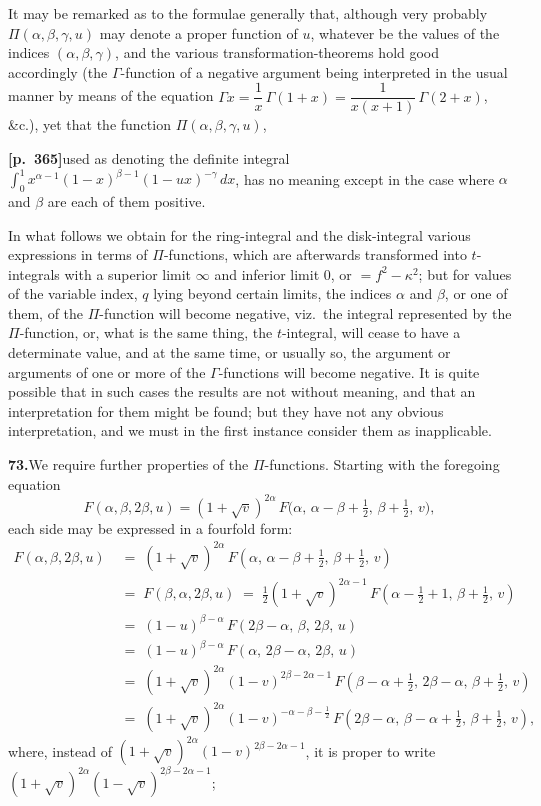 \documentclass[11pt]{article}
\begin{document}
It may be remarked as to the formulae generally that, although very probably $\Pi(\alpha,\beta,\gamma,u)$ may denote a proper function of $u$, whatever be the values of the indices $(\alpha,\beta,\gamma)$, and the various transformation-theorems hold good accordingly (the $\Gamma$-function of a negative argument being interpreted in the usual manner by means of the equation $\Gamma x = \dfrac{1}{x}\,\Gamma(1+x) = \dfrac{1}{x(x+1)}\,\Gamma(2+x)$, \&c.), yet that the function $\Pi(\alpha,\beta,\gamma,u)$,

\bigskip

\noindent\textbf{[p.~365]}\quad used as denoting the definite integral $\displaystyle\int_{0}^{1} x^{\alpha-1}(1-x)^{\beta-1}(1-ux)^{-\gamma}\,dx$, has no meaning except in the case where $\alpha$ and $\beta$ are each of them positive.

In what follows we obtain for the ring-integral and the disk-integral various expressions in terms of $\Pi$-functions, which are afterwards transformed into $t$-integrals with a superior limit $\infty$ and inferior limit $0$, or $=f^{2}-\kappa^{2}$; but for values of the variable index, $q$ lying beyond certain limits, the indices $\alpha$ and $\beta$, or one of them, of the $\Pi$-function will become negative, viz.\ the integral represented by the $\Pi$-function, or, what is the same thing, the $t$-integral, will cease to have a determinate value, and at the same time, or usually so, the argument or arguments of one or more of the $\Gamma$-functions will become negative. It is quite possible that in such cases the results are not without meaning, and that an interpretation for them might be found; but they have not any obvious interpretation, and we must in the first instance consider them as inapplicable.

\bigskip

\noindent\textbf{73.}\quad We require further properties of the $\Pi$-functions. Starting with the foregoing equation
\[
F(\alpha,\beta,2\beta,u) = (1+\sqrt{v})^{2\alpha}\,F\bigl(\alpha,\,\alpha-\beta+\tfrac{1}{2},\,\beta+\tfrac{1}{2},\,v\bigr),
\]
each side may be expressed in a fourfold form:
\begin{align*}
F(\alpha,\beta,2\beta,u) &\;=\; (1+\sqrt{v})^{2\alpha}\,F(\alpha,\,\alpha-\beta+\tfrac{1}{2},\,\beta+\tfrac{1}{2},\,v) \\
&\;=\; F(\beta,\alpha,2\beta,u) \;=\; \tfrac{1}{2}(1+\sqrt{v})^{2\alpha-1}\,F(\alpha-\tfrac{1}{2}+1,\,\beta+\tfrac{1}{2},\,v) \\
&\;=\; (1-u)^{\beta-\alpha}\,F(2\beta-\alpha,\,\beta,\,2\beta,\,u) \\
&\;=\; (1-u)^{\beta-\alpha}\,F(\alpha,\,2\beta-\alpha,\,2\beta,\,u) \\
&\;=\; (1+\sqrt{v})^{2\alpha}(1-v)^{2\beta-2\alpha-1}\,F(\beta-\alpha+\tfrac{1}{2},\,2\beta-\alpha,\,\beta+\tfrac{1}{2},\,v) \\
&\;=\; (1+\sqrt{v})^{2\alpha}(1-v)^{-\alpha-\beta-\frac{1}{2}}\,F(2\beta-\alpha,\,\beta-\alpha+\tfrac{1}{2},\,\beta+\tfrac{1}{2},\,v),
\end{align*}
where, instead of $(1+\sqrt{v})^{2\alpha}(1-v)^{2\beta-2\alpha-1}$, it is proper to write $(1+\sqrt{v})^{2\alpha}(1-\sqrt{v})^{2\beta-2\alpha-1}$;
\end{document}
